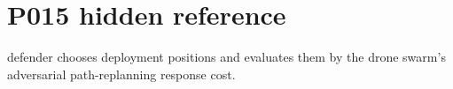 \section*{P015 hidden reference}\nThe defender chooses deployment positions and evaluates them by the drone swarm's adversarial path-replanning response cost.\n